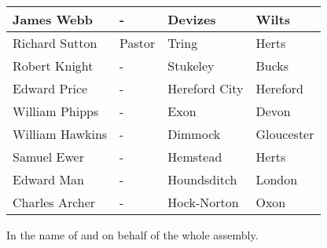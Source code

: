 \documentclass[12pt,a4paper]{book}
\begin{document}
\begin{tabularx}{\textwidth}{|l|l|l|l|}
\midrule
James Webb & - & Devizes & Wilts\\
\midrule
Richard Sutton & Pastor & Tring & Herts\\
\midrule
Robert Knight & - & Stukeley & Bucks\\
\midrule
Edward Price & - & Hereford City & Hereford\\
\midrule
William Phipps & - & Exon & Devon\\
\midrule
William Hawkins & - & Dimmock & Gloucester\\
\midrule
Samuel Ewer & - & Hemstead & Herts\\
\midrule
Edward Man & - & Houndsditch & London\\
\midrule
Charles Archer & - & Hock-Norton & Oxon\\
\bottomrule
\end{tabularx}

In the name of and on behalf of the whole assembly.
\end{document}
